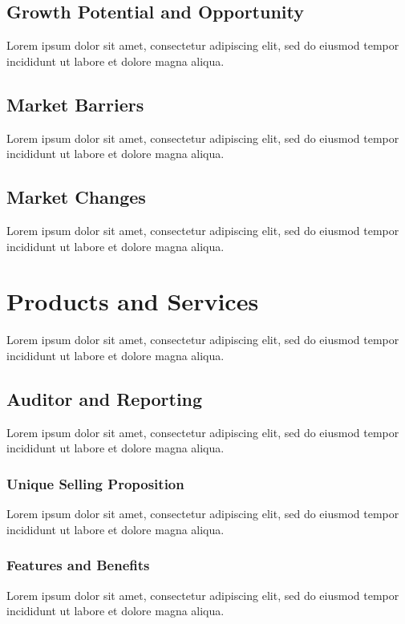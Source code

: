 \subsection{Growth Potential and Opportunity}

Lorem ipsum dolor sit amet, consectetur adipiscing elit, sed do eiusmod tempor incididunt ut labore et dolore magna aliqua.

\subsection{Market Barriers}

Lorem ipsum dolor sit amet, consectetur adipiscing elit, sed do eiusmod tempor incididunt ut labore et dolore magna aliqua.

\subsection{Market Changes}

Lorem ipsum dolor sit amet, consectetur adipiscing elit, sed do eiusmod tempor incididunt ut labore et dolore magna aliqua.


\section{Products and Services}
Lorem ipsum dolor sit amet, consectetur adipiscing elit, sed do eiusmod tempor incididunt ut labore et dolore magna aliqua.


\subsection{Auditor and Reporting}
Lorem ipsum dolor sit amet, consectetur adipiscing elit, sed do eiusmod tempor incididunt ut labore et dolore magna aliqua.

\subsubsection*{Unique Selling Proposition}
Lorem ipsum dolor sit amet, consectetur adipiscing elit, sed do eiusmod tempor incididunt ut labore et dolore magna aliqua.

\subsubsection*{Features and Benefits}
Lorem ipsum dolor sit amet, consectetur adipiscing elit, sed do eiusmod tempor incididunt ut labore et dolore magna aliqua.

